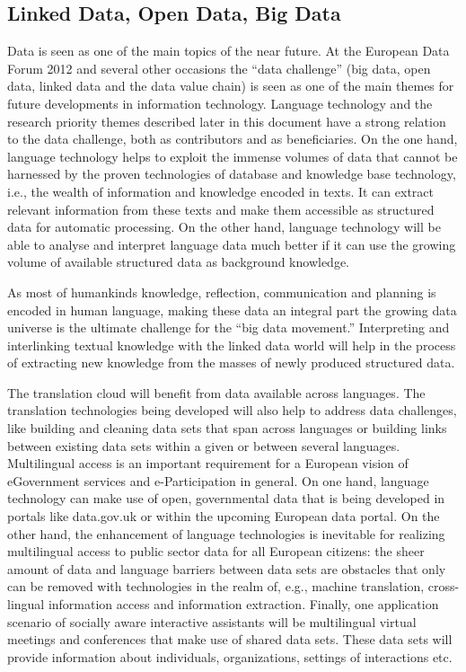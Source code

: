 \documentclass[10pt, plain]{../../metanetpaper}
\begin{document}
\begin{multicols}{2}
\subsection{Linked Data, Open Data, Big Data}
\label{sec:linked-data-open}

Data is seen as one of the main topics of the near future. At the European Data Forum 2012 and several other occasions the “data challenge” (big data, open data, linked data and the data value chain) is seen as one of the main themes for future developments in information technology. Language technology and the research priority themes described later in this document have a strong relation to the data challenge, both as contributors and as beneficiaries. On the one hand, language technology helps to exploit the immense volumes of data that cannot be harnessed by the proven technologies of database and knowledge base technology, i.e., the wealth of information and knowledge encoded in texts. It can extract relevant information from these texts and make them accessible as structured data for automatic processing. On the other hand, language technology will be able to analyse and interpret language data much better if it can use the growing volume of available structured data as background knowledge. 

As most of humankinds knowledge, reflection, communication and planning is encoded in human language, making these data an integral part the growing data universe is the ultimate challenge for the “big data movement.”  Interpreting and interlinking textual knowledge with the linked data world will help in the process of extracting new knowledge from the masses of newly produced structured data. 

The translation cloud will benefit from data available across languages. The translation technologies being developed will also help to address data challenges, like building and cleaning data sets that span across languages or building links between existing data sets within a given or between several languages. Multilingual access is an important requirement for a European vision of eGovernment services and e-Participation in general. On one hand, language technology can make use of open, governmental data that is being developed in portals like data.gov.uk or within the upcoming European data portal. On the other hand, the enhancement of language technologies is inevitable for realizing multilingual access to public sector data for all European citizens: the sheer amount of data and language barriers between data sets are obstacles that only can be removed with technologies in the realm of, e.g., machine translation, cross-lingual information access and information extraction. Finally,  one application scenario of socially aware interactive assistants will be multilingual virtual meetings and conferences that make use of shared data sets. These data sets will provide information about individuals, organizations, settings of interactions etc.


\end{multicols}
\end{document}
